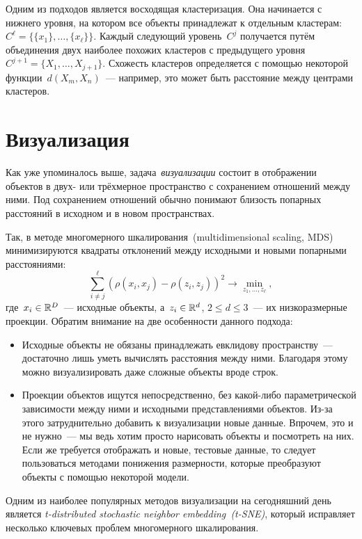 \documentclass[12pt,fleqn]{article}
\begin{document}
Одним из подходов является восходящая кластеризация.
Она начинается с нижнего уровня, на котором все объекты
принадлежат к отдельным кластерам:~$C^\ell = \{\{x_1\}, \dots, \{x_\ell\}\}$.
Каждый следующий уровень~$C^j$ получается путём объединения двух наиболее похожих
кластеров с предыдущего уровня~$C^{j + 1} = \{X_1, \dots, X_{j + 1}\}$.
Схожесть кластеров определяется с помощью некоторой функции~$d(X_m, X_n)$~---
например, это может быть расстояние между центрами кластеров.

\section{Визуализация}
Как уже упоминалось выше, задача~\emph{визуализации} состоит в отображении
объектов в двух- или трёхмерное пространство с сохранением отношений между ними.
Под сохранением отношений обычно понимают близость попарных расстояний в исходном
и в новом пространствах.

Так, в методе многомерного шкалирования~(multidimensional scaling, MDS)
минимизируются квадраты отклонений между исходными и новыми попарными расстояниями:
\[
    \sum_{i \neq j}^{\ell}
        \left(
            \rho(x_i, x_j)
            -
            \rho(z_i, z_j)
        \right)^2
    \to
    \min_{z_1, \dots, z_\ell},
\]
где~$x_i \in \mathbb{R}^D$~--- исходные объекты, а~$z_i \in \mathbb{R}^d$, $2 \leq d \leq 3$~---
их низкоразмерные проекции.
Обратим внимание на две особенности данного подхода:
\begin{itemize}
    \item Исходные объекты не обязаны принадлежать евклидову пространству~---
        достаточно лишь уметь вычислять расстояния между ними.
        Благодаря этому можно визуализировать даже сложные объекты вроде строк.
    \item Проекции объектов ищутся непосредственно, без какой-либо параметрической
        зависимости между ними и исходными представлениями объектов.
        Из-за этого затруднительно добавить к визуализации новые данные.
        Впрочем, это и не нужно~--- мы ведь хотим просто нарисовать объекты
        и посмотреть на них.
        Если же требуется отображать и новые, тестовые данные, то следует пользоваться
        методами понижения размерности, которые преобразуют объекты с помощью некоторой модели.
\end{itemize}

Одним из наиболее популярных методов визуализации на сегодняшний день является
\emph{t-distributed stochastic neighbor embedding~(t-SNE)},
который исправляет несколько ключевых проблем многомерного шкалирования.
\end{document}
